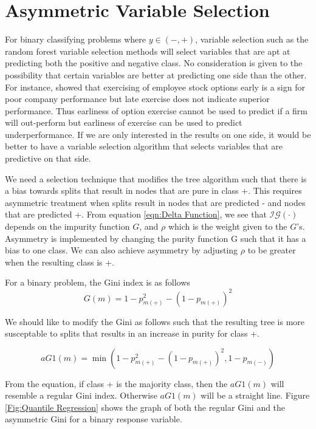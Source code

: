 \section{Asymmetric Variable Selection}
For binary classifying problems where $y\in (-,+)$, variable selection such as the random forest variable selection methods will select variables that are apt at predicting both the positive and negative class. No consideration is given to the possibility that certain variables are better at predicting one side than the other. For instance, \cite{Bettis05} showed that exercising of employee stock options early is a sign for poor company performance but late exercise does not indicate superior performance. Thus earliness of option exercise cannot be used to predict if a firm will out-perform but earliness of exercise can be used to predict underperformance. If we are only interested in the results on one side, it would be better to have a variable selection algorithm that selects variables that are predictive on that side. 

We need a selection technique that modifies the tree algorithm such that there is a bias towards splits that result in nodes that are pure in class +. This requires asymmetric treatment when splits result in nodes that are predicted - and nodes that are predicted +. From equation \ref{eqn:Delta Function}, we see that $\mathcal{IG}(\cdot)$ depends on the impurity function $G$, and $\rho$ which is the weight given to the $G$'s. Asymmetry is implemented by changing the purity function G such that it has a bias to one class. We can also achieve asymmetry by adjusting $\rho$ to be greater when the resulting class is +. 

For a binary problem, the Gini index is as follows
\begin{equation}\label{eqn:giniindex}
	G(m)=1-p_{m(+)}^2-(1-p_{m(+)})^2
\end{equation}

We should like to modify the Gini as follows such that the resulting tree is more susceptable to splits that results in an increase in purity for class +. 

\begin{equation}\label{eqn:asymmetricginiindex1}
	aG1(m)=\min(1-p_{m(+)}^2-(1-p_{m(+)})^2, 1-p_{m(-)})
\end{equation}

From the equation, if class + is the majority class, then the $aG1(m)$ will resemble a regular Gini index. Otherwise  $aG1(m)$ will be a straight line. Figure \ref{Fig:Quantile Regression} shows the graph of both the regular Gini and the asymmetric Gini for a binary response variable.

